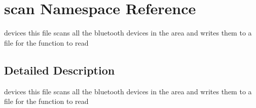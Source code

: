 \hypertarget{namespacescan}{}\section{scan Namespace Reference}
\label{namespacescan}


devices this file scans all the bluetooth devices in the area and writes them to a file for the function to read  




\subsection{Detailed Description}
devices this file scans all the bluetooth devices in the area and writes them to a file for the function to read 